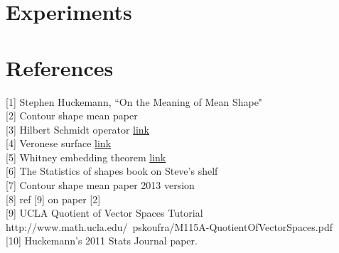 \documentclass[12pt]{article}
\theoremstyle{definition}
\theoremstyle{remark}
\numberwithin{equation}{section}
\begin{document}
\section{Experiments}
\section{References}
[1] Stephen Huckemann, ``On the Meaning of Mean Shape" \\[0.2cm]
[2] Contour shape mean paper\\[0.2cm]
[3] Hilbert Schmidt operator \href{http://en.wikipedia.org/wiki/Hilbert\%E2\%80\%93Schmidt_operator}{link}\\[0.2cm]
[4] Veronese surface \href{http://en.wikipedia.org/wiki/Veronese_surface}{link}\\[0.2cm]
[5] Whitney embedding theorem \href{http://en.wikipedia.org/wiki/Whitney_embedding_theorem}{link}\\[0.2cm]
[6] The Statistics of shapes book on Steve's shelf\\[0.2cm]
[7] Contour shape mean paper 2013 version \\[0.2cm]
[8] ref [9] on paper [2] \\[0.2cm]
[9] UCLA Quotient of Vector Spaces Tutorial  \\[0.2cm]
http://www.math.ucla.edu/~pskoufra/M115A-QuotientOfVectorSpaces.pdf\\[0.2cm]
[10] Huckemann's 2011 Stats Journal paper.
\end{document}
